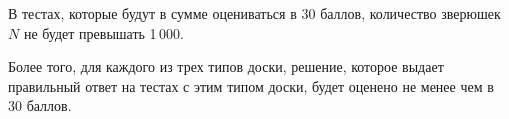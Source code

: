 В тестах, которые будут в сумме оцениваться в $30$ баллов, количество зверюшек $N$ не будет
превышать 1\,000.

Более того, для каждого из трех типов доски, решение, которое выдает правильный ответ на тестах с
этим типом доски, будет оценено не менее чем в $30$ баллов.
